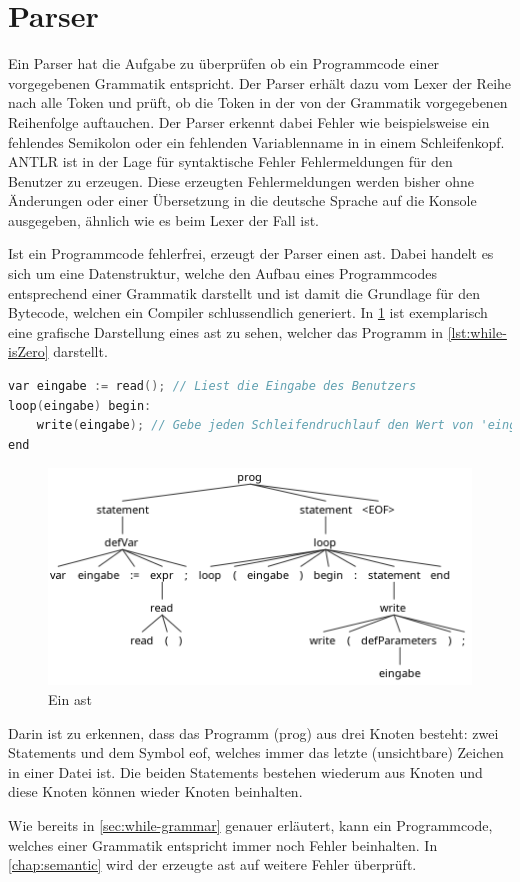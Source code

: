\section{Parser}
Ein Parser hat die Aufgabe zu überprüfen ob ein Programmcode einer vorgegebenen Grammatik entspricht. Der Parser erhält dazu vom Lexer der Reihe nach alle Token und prüft, ob die Token in der von der Grammatik vorgegebenen Reihenfolge auftauchen. Der Parser erkennt dabei Fehler wie beispielsweise ein fehlendes Semikolon oder ein fehlenden Variablenname in in einem Schleifenkopf. ANTLR ist in der Lage für syntaktische Fehler Fehlermeldungen für den Benutzer zu erzeugen. Diese erzeugten Fehlermeldungen werden bisher ohne Änderungen oder einer Übersetzung in die deutsche Sprache auf die Konsole ausgegeben, ähnlich wie es beim Lexer der Fall ist.  

Ist ein Programmcode fehlerfrei, erzeugt der Parser einen \ac{ast}. Dabei handelt es sich um eine Datenstruktur, welche den Aufbau eines Programmcodes entsprechend einer Grammatik darstellt und ist damit die Grundlage für den Bytecode, welchen ein Compiler schlussendlich generiert. In \cref{pic:isZeroAST} ist exemplarisch eine grafische Darstellung eines \ac{ast} zu sehen, welcher das Programm in \cref{lst:while-isZero} darstellt. 

\begin{lstlisting}[language=c, caption=Prueft ob ein Wert 0 ist, label={lst:while-isZero}]
var eingabe := read(); // Liest die Eingabe des Benutzers
loop(eingabe) begin:
	write(eingabe); // Gebe jeden Schleifendruchlauf den Wert von 'eingabe' aus
end
\end{lstlisting}

\begin{figure}[h!]
	\centering
	\includegraphics[width=12cm]{content/pictures/ast.png}
	\caption{Ein \acl{ast}}
	\label{pic:isZeroAST}
\end{figure}

Darin ist zu erkennen, dass das Programm (prog) aus drei Knoten besteht: zwei Statements und dem Symbol \ac{eof}, welches immer das letzte (unsichtbare) Zeichen in einer Datei ist. Die beiden Statements bestehen wiederum aus Knoten und diese Knoten können wieder Knoten beinhalten. 

Wie bereits in \cref{sec:while-grammar} genauer erläutert, kann ein Programmcode, welches einer Grammatik entspricht immer noch Fehler beinhalten. In \cref{chap:semantic} wird der erzeugte \ac{ast} auf weitere Fehler überprüft.